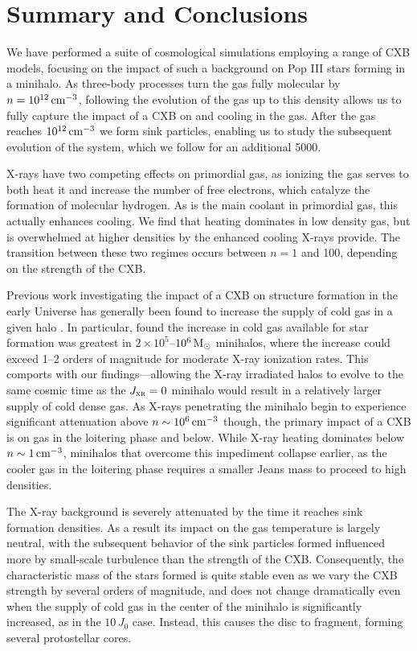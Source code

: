 \documentclass[../thesis.tex]{subfiles}
\begin{document}
\section{Summary and Conclusions}
\label{xr:conclusions}
We have performed a suite of cosmological simulations employing a range of CXB models, focusing on the impact of such a background on Pop III stars forming in a minihalo.  As three-body processes turn the gas fully molecular by $n=10^{12}\,\mathrm{cm}^{-3}$, following the evolution of the gas up to this density allows us to fully capture the impact of a CXB on \htwo and \hd cooling in the gas.  After the gas reaches $10^{12}\,\mathrm{cm}^{-3}$ we form sink particles, enabling us to study the subsequent evolution of the system, which we follow for an additional 5000\yr.

X-rays have two competing effects on primordial gas, as ionizing the gas serves to both heat it and increase the number of free electrons, which catalyze the formation of molecular hydrogen.  As \htwo is the main coolant in primordial gas, this actually enhances cooling.  We find that heating dominates in low density gas, but is overwhelmed at higher densities by the enhanced cooling X-rays provide.  The transition between these two regimes occurs between $n=1$ and 100\cc, depending on the strength of the CXB.  

Previous work investigating the impact of a CXB on structure formation in the early Universe has generally been found to increase the supply of cold gas in a given halo \citep{HaimanAbelRees2000, VenkatesanGirouxShull2001, GloverBrand2003, Cen2003, KuhlenMadau2005, Jeonetal2012}.  In particular, \citet{KuhlenMadau2005} found the increase in cold gas available for star formation was greatest in $2\times10^5$--$10^6\,\mathrm{M}_{\odot}$ minihalos, where the increase could exceed 1--2 orders of magnitude for moderate X-ray ionization rates. This comports with our findings---allowing the X-ray irradiated halos to evolve to the same cosmic time as the $J_{\textsc{xr}}=0$ minihalo would result in a relatively larger supply of cold dense gas. As X-rays penetrating the minihalo begin to experience significant attenuation above $n\sim10^6\,\mathrm{cm}^{-3}$ though, the primary impact of a CXB is on gas in the loitering phase and below. While X-ray heating dominates below $n\sim 1\,\mathrm{cm}^{-3}$, minihalos that overcome this impediment collapse earlier, as the cooler gas in the loitering phase requires a smaller Jeans mass to proceed to high densities.  

The X-ray background is severely attenuated by the time it reaches sink formation densities. As a result its impact on the gas temperature is largely neutral, with the subsequent behavior of the sink particles formed influenced more by small-scale  turbulence than the strength of the CXB.  Consequently, the characteristic mass of the stars formed is quite stable even as we vary the CXB strength by several orders of magnitude, and does not change dramatically even when the supply of cold gas in the center of the minihalo is significantly increased, as in the $10\,J_0$ case.  Instead, this causes the disc to fragment, forming several protostellar cores.
\end{document}
